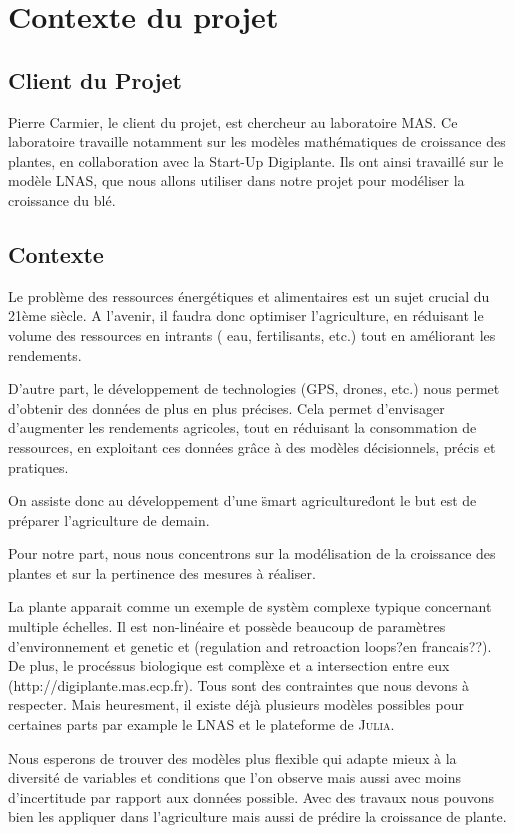\section{Contexte du projet}

\subsection{Client du Projet}
Pierre Carmier, le client du projet, est chercheur au laboratoire MAS. Ce laboratoire travaille notamment sur les modèles mathématiques de croissance des plantes, en collaboration avec la Start-Up Digiplante. Ils ont ainsi travaillé sur le modèle LNAS, que nous allons utiliser dans notre projet pour modéliser la croissance du blé.
\subsection{Contexte}
Le problème des ressources énergétiques et alimentaires est un sujet crucial du  21ème siècle.
A l'avenir, il faudra donc optimiser l'agriculture, en réduisant le volume des ressources en intrants ( eau, fertilisants, etc.) tout en améliorant les rendements.

D'autre part, le développement de technologies (GPS, drones, etc.) nous permet d'obtenir des données de plus en plus précises. 
Cela permet d'envisager d'augmenter les rendements agricoles, tout en réduisant la consommation de ressources, en exploitant ces données grâce à des modèles décisionnels, précis et pratiques. 

On assiste donc au développement d'une \"smart agriculture\" dont le but est de préparer
l'agriculture de demain.

Pour notre part, nous nous concentrons sur la modélisation de la croissance des plantes et sur la pertinence des mesures à réaliser.

La plante apparait comme un exemple de systèm complexe typique concernant 
multiple échelles. Il est non-linéaire et possède beaucoup de paramètres
d'environnement et genetic et (regulation and retroaction loops?en francais??).
De plus,  le procéssus biologique est complèxe et a intersection entre eux
(http://digiplante.mas.ecp.fr). Tous sont des contraintes que 
nous devons à respecter. Mais heuresment, 
il existe déjà plusieurs modèles possibles pour certaines parts 
par example le LNAS et le plateforme de \textsc{Julia}.

Nous esperons de trouver des modèles plus flexible qui adapte mieux à la diversité
de variables et conditions que l'on observe mais aussi avec moins d'incertitude 
par rapport aux données possible. Avec des travaux 
nous pouvons bien les appliquer dans l'agriculture 
mais aussi de prédire la croissance de plante.
